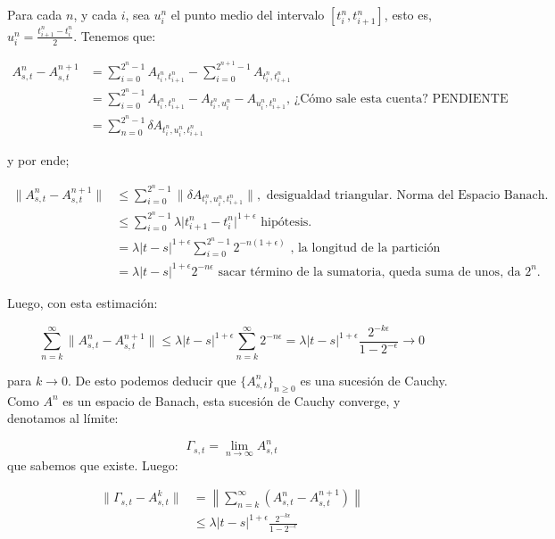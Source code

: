 Para cada $n$, y cada $i$, sea $u_i^n$ el punto medio del intervalo $[t_i^n, t_{i+1}^n]$, esto es, $u_i^n = \frac{t_{i+1}^n - t_i^n}{2}$. Tenemos que:

\begin{align*}
	A^n_{s,t} - A^{n + 1}_{s,t} &= \sum_{i = 0}^{2^n - 1} A_{t_i^n,t_{i+1}^n} - \sum_{i = 0}^{2^{n+1} - 1} A_{t^n_i, t^n_{i + 1}} \\
	&= \sum_{i = 0}^{2^n - 1} A_{t_i^n, t_{i+1}^n} - A_{t_i^n, u_i^n} -  A_{u_i^n, t_{i+1}^n} \text{, ¿Cómo sale esta cuenta? PENDIENTE} \\
	&= \sum_{n = 0}^{2^n - 1} \delta A_{t_i^n, u_i^n, t_{i+1}^n}
\end{align*}

y por ende;

\begin{align*}
	\lVert  A_{s,t}^n - A_{s,t}^{n+1} \rVert &\leq \sum_{i = 0}^{2^n - 1} \lVert \delta A_{ t_i^n, u_i^n, t_{i+1}^n } \rVert, \text{ desigualdad triangular. Norma del Espacio Banach.} \\
	&\leq \sum_{i = 0}^{2^n - 1} \lambda \lvert  t_{i + 1}^n - t_i^n \rvert^{1+ \epsilon} \text{ hipótesis. } \\
	&= \lambda \lvert t - s \rvert^{1 + \epsilon} \sum_{i = 0}^{2^n - 1} 2^{-n(1 + \epsilon)} \text{ , la longitud de la partición } \\
	&= \lambda \lvert t - s \rvert^{1 + \epsilon} 2^{ -n\epsilon} \text{ sacar término de la sumatoria, queda suma de unos, da } 2^n.
\end{align*}


Luego, con esta estimación:

\[
	\sum_{n = k}^{\infty} \lVert A_{s,t}^n - A_{s,t}^{n+1} \rVert \leq \lambda \lvert t - s \rvert^{1 + \epsilon} \sum_{n = k}^{\infty} 2^{-n\epsilon} = \lambda \lvert t - s \rvert^{1 + \epsilon} \frac{2^{-k \epsilon}}{1 - 2^{-\epsilon}} \rightarrow 0
\]

para $k \rightarrow 0$. De esto podemos deducir que $\{ A_{s,t}^n \}_{n \geq 0}$ es una sucesión de Cauchy. Como $A^n$ es un espacio de Banach, esta sucesión de Cauchy converge, y denotamos al límite:

\[
	\Gamma_{s,t} = \lim_{n \rightarrow \infty} A^n_{s,t}
\]
que sabemos que existe. Luego:

\begin{align*}
	\lVert \Gamma_{s,t} - A_{s,t}^k \rVert &= \left\lVert \sum_{ n = k }^{ \infty } (A_{s,t}^n - A_{s,t}^{n+1}) \right\rVert \\
	&\leq \lambda \lvert t - s \rvert^{1 + \epsilon} \frac{2^{-k\epsilon}}{1 - 2^{-\epsilon}}  
\end{align*}

